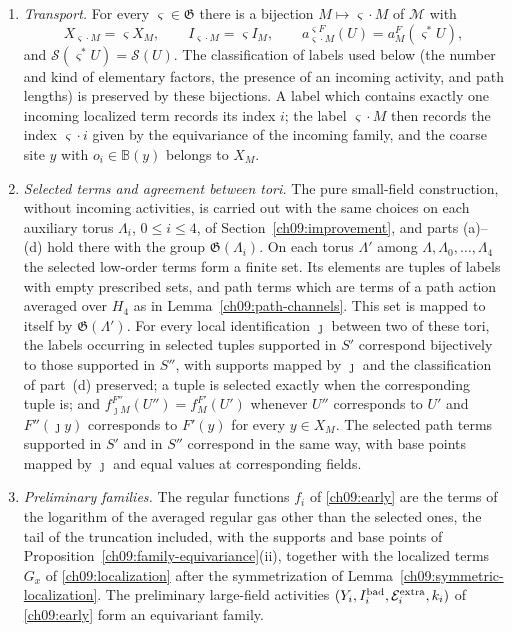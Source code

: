 \begin{assumption}
\begin{enumerate}[label=\textup{(\alph*)}]
 majorants of the table following it, and the comparison estimates of
 Section~\ref{ch09:improvement} hold for every $F$ with right sides
 that do not depend on $F$.
\item \emph{Transport.} For every $\varsigma\in\mathfrak G$ there is a
 bijection $M\mapsto\varsigma\cdot M$ of $\mathcal M$ with
 \[
  X_{\varsigma\cdot M}=\varsigma X_M,\qquad
  I_{\varsigma\cdot M}=\varsigma I_M,\qquad
  a^{\varsigma F}_{\varsigma\cdot M}(U)=a^F_M(\varsigma^*U),
 \]
 and $\mathscr S(\varsigma^*U)=\mathscr S(U)$. The classification of
 labels used below (the number and kind of elementary factors, the
 presence of an incoming activity, and path lengths) is preserved by
 these bijections. A label which contains exactly one incoming localized
 term records its index $i$; the label $\varsigma\cdot M$ then
 records the index $\varsigma\cdot i$ given by the equivariance of the
 incoming family, and the coarse site $y$ with $o_i\in\mathbb B(y)$
 belongs to $X_M$.
\item \emph{Selected terms and agreement between tori.} The pure
 small-field construction, without incoming activities, is carried out
 with the same choices on each auxiliary torus $\Lambda_i$,
 $0\le i\le4$, of Section~\ref{ch09:improvement}, and parts
 \textup{(a)}--\textup{(d)} hold there with the group
 $\mathfrak G(\Lambda_i)$. On each torus $\Lambda'$ among
 $\Lambda,\Lambda_0,\ldots,\Lambda_4$ the selected low-order terms form
 a finite set. Its elements are tuples of labels with empty prescribed
 sets, and path terms which are terms of a path action averaged over
 $H_4$ as in Lemma~\ref{ch09:path-channels}. This set is mapped to
 itself by $\mathfrak G(\Lambda')$. For every local identification
 $\jmath$ between two of these tori, the labels occurring in selected
 tuples supported in $S'$ correspond bijectively to those supported in
 $S''$, with supports mapped by $\jmath$ and the classification of
 part~\textup{(d)} preserved; a tuple is selected exactly when the
 corresponding tuple is; and
 $f^{F''}_{\jmath M}(U'')=f^{F'}_M(U')$ whenever $U''$ corresponds to
 $U'$ and $F''(\jmath y)$ corresponds to $F'(y)$ for every $y\in X_M$.
 The selected path terms supported in $S'$ and in $S''$ correspond in
 the same way, with base points mapped by $\jmath$ and equal values at
 corresponding fields.
\item \emph{Preliminary families.} The regular functions $f_i$ of
 \eqref{ch09:early} are the terms of the logarithm of the averaged
 regular gas other than the selected ones, the tail of the truncation
 included, with the supports and base points of
 Proposition~\ref{ch09:family-equivariance}\textup{(ii)}, together
 with the localized terms $G_x$ of \eqref{ch09:localization} after the
 symmetrization of Lemma~\ref{ch09:symmetric-localization}. The preliminary large-field activities
 $(Y_i,I_i^{\rm bad},\mathcal E_i^{\rm extra},k_i)$ of
 \eqref{ch09:early} form an equivariant family.
\end{enumerate}
\end{assumption}

